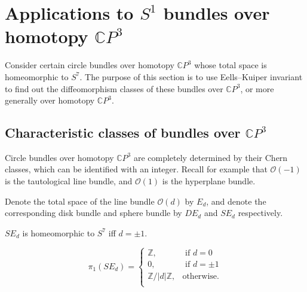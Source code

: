 \documentclass[twoside]{article}
\begin{document}
\section{Applications to \texorpdfstring{$S^1$}{S1} bundles over homotopy \texorpdfstring{$\mathbb{C}P^3$}{CP3}}

Consider certain circle bundles over homotopy $\mathbb{C}P^3$ whose total space is homeomorphic to $S^7$. The purpose of this section is to use Eells--Kuiper invariant to find out the diffeomorphism classes of these bundles over $\mathbb{C}P^3$, or more generally over homotopy $\mathbb{C}P^3$. 

\subsection{Characteristic classes of bundles over \texorpdfstring{$\mathbb{C}P^3$}{CP3}}

Circle bundles over homotopy $\mathbb{C}P^3$ are completely determined by their Chern classes, which can be identified with an integer. Recall for example that $\mathcal{O}(-1)$ is the tautological line bundle, and $\mathcal{O}(1)$ is the hyperplane bundle. 

Denote the total space of the line bundle $\mathcal{O}(d)$ by $E_d$, and denote the corresponding disk bundle and sphere bundle by $DE_d$ and $SE_d$ respectively. 
\begin{thm}
	$SE_d$ is homeomorphic to $S^7$ iff $d = \pm 1$. 
\end{thm}

\begin{lem}
	\[
	\pi_1(SE_d) = \left \{ 
	\begin{array}{ll}
	\mathbb{Z}, & \text { if } d = 0 \\
	0, & \text { if } d = \pm 1\\
	\mathbb{Z}/|d|\mathbb{Z}, 
	& \text{otherwise.}\\
	\end{array}\right. 
	\]
\end{lem}
\end{document}
